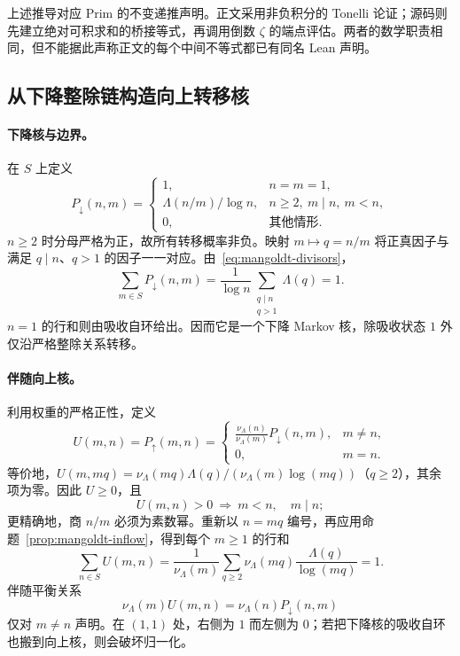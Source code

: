 上述推导对应 Prim 的不变递推声明。正文采用非负积分的 Tonelli 论证；源码则先建立绝对可积求和的桥接等式，再调用倒数 $\zeta$ 的端点评估。两者的数学职责相同，但不能据此声称正文的每个中间不等式都已有同名 Lean 声明。

\subsection{从下降整除链构造向上转移核}
\paragraph{下降核与边界。}
在 $S$ 上定义
\begin{equation}\label{eq:downward-kernel}
 P_\downarrow(n,m)=
 \begin{cases}
 1,&n=m=1,\\
 \Lambda(n/m)/\log n,&n\ge2,\ m\mid n,\ m<n,\\
 0,&\text{其他情形}.
 \end{cases}
\end{equation}
$n\ge2$ 时分母严格为正，故所有转移概率非负。映射 $m\mapsto q=n/m$ 将正真因子与满足 $q\mid n$、$q>1$ 的因子一一对应。由~\eqref{eq:mangoldt-divisors}，
\[
 \sum_{m\in S}P_\downarrow(n,m)
 =\frac1{\log n}\sum_{\substack{q\mid n\\q>1}}\Lambda(q)=1.
\]
$n=1$ 的行和则由吸收自环给出。因而它是一个下降 Markov 核，除吸收状态 $1$ 外仅沿严格整除关系转移。

\paragraph{伴随向上核。}
利用权重的严格正性，定义
\begin{equation}\label{eq:upward-kernel}
 U(m,n)=P_\uparrow(m,n)=
 \begin{cases}
 \displaystyle\frac{\nu_\Lambda(n)}{\nu_\Lambda(m)}P_\downarrow(n,m),&m\ne n,\\
 0,&m=n.
 \end{cases}
\end{equation}
等价地，$U(m,mq)=\nu_\Lambda(mq)\Lambda(q)/(\nu_\Lambda(m)\log(mq))$（$q\ge2$），其余项为零。因此 $U\ge0$，且
\[
 U(m,n)>0\ \Longrightarrow\ m<n,\quad m\mid n;
\]
更精确地，商 $n/m$ 必须为素数幂。重新以 $n=mq$ 编号，再应用命题~\ref{prop:mangoldt-inflow}，得到每个 $m\ge1$ 的行和
\begin{equation}\label{eq:upward-normalization}
 \sum_{n\in S}U(m,n)
 =\frac1{\nu_\Lambda(m)}\sum_{q\ge2}
    \nu_\Lambda(mq)\frac{\Lambda(q)}{\log(mq)}=1.
\end{equation}
伴随平衡关系
\[
 \nu_\Lambda(m)U(m,n)=\nu_\Lambda(n)P_\downarrow(n,m)
\]
仅对 $m\ne n$ 声明。在 $(1,1)$ 处，右侧为 $1$ 而左侧为 $0$；若把下降核的吸收自环也搬到向上核，则会破坏归一化。


